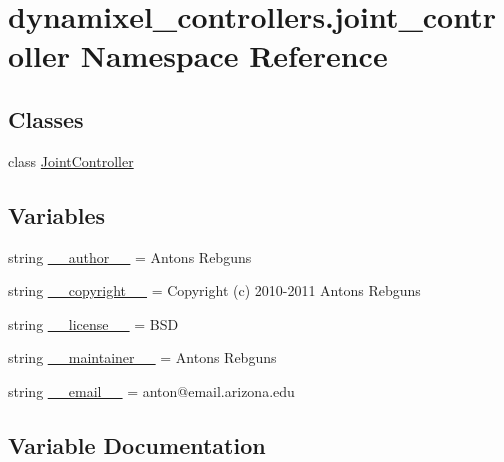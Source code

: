 \hypertarget{namespacedynamixel__controllers_1_1joint__controller}{}\section{dynamixel\+\_\+controllers.\+joint\+\_\+controller Namespace Reference}
\label{namespacedynamixel__controllers_1_1joint__controller}
\subsection*{Classes}
\begin{DoxyCompactItemize}
\item 
class \hyperlink{classdynamixel__controllers_1_1joint__controller_1_1_joint_controller}{Joint\+Controller}
\end{DoxyCompactItemize}
\subsection*{Variables}
\begin{DoxyCompactItemize}
\item 
string \hyperlink{namespacedynamixel__controllers_1_1joint__controller_a49708ca445abc78753f1385c740f47d2}{\+\_\+\+\_\+author\+\_\+\+\_\+} = \textquotesingle{}Antons Rebguns\textquotesingle{}
\item 
string \hyperlink{namespacedynamixel__controllers_1_1joint__controller_a4be9ec95e183eb3310638495d62410f3}{\+\_\+\+\_\+copyright\+\_\+\+\_\+} = \textquotesingle{}Copyright (c) 2010-\/2011 Antons Rebguns\textquotesingle{}
\item 
string \hyperlink{namespacedynamixel__controllers_1_1joint__controller_a4a159e41c9be0cad82e588ae8a8ae086}{\+\_\+\+\_\+license\+\_\+\+\_\+} = \textquotesingle{}B\+SD\textquotesingle{}
\item 
string \hyperlink{namespacedynamixel__controllers_1_1joint__controller_a3e4c5fcd42ec78ddaa3c3dfb03834050}{\+\_\+\+\_\+maintainer\+\_\+\+\_\+} = \textquotesingle{}Antons Rebguns\textquotesingle{}
\item 
string \hyperlink{namespacedynamixel__controllers_1_1joint__controller_ab1301ccd679614506793273aef5eced5}{\+\_\+\+\_\+email\+\_\+\+\_\+} = \textquotesingle{}anton@email.\+arizona.\+edu\textquotesingle{}
\end{DoxyCompactItemize}


\subsection{Variable Documentation}
\mbox{\label{namespacedynamixel__controllers_1_1joint__controller_a49708ca445abc78753f1385c740f47d2}} 
